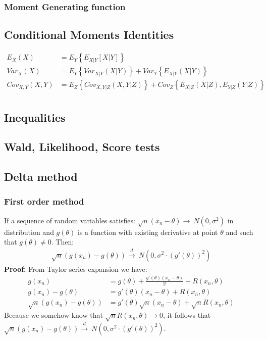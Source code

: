 \documentclass[]{article}
\begin{document}
\subsubsection{Moment Generating function}
\subsection{Conditional Moments Identities}
$$
\begin{aligned}
	E_X(X) &= E_Y\left\{E_{X|Y}[X|Y]\right\}\\
	Var_X(X)&= E_Y\left\{Var_{X|Y}(X|Y)\right\}  +   Var_Y\left\{E_{X|Y}(X|Y)\right\}\\
	Cov_{X,Y}(X,Y)&= E_Z\left\{Cov_{X,Y|Z}(X,Y|Z)\right\}  +   Cov_Z\left\{E_{X|Z}(X|Z), E_{Y|Z}(Y|Z)\right\}\\
\end{aligned}
$$


\subsection{Inequalities}
\subsection{Wald, Likelihood, Score tests}
\subsection{Delta method}
\subsubsection{First order method}
If a sequence of random variables satisfies: $\sqrt{n}(x_n - \theta) \rightarrow~N(0, \sigma^2)$ in distribution and $g(\theta)$ is a function with existing derivative at point $\theta$ and such that $g(\theta) \neq 0$. Then:
$$
\begin{aligned}
	\sqrt{n}(g(x_n) - g(\theta)) \overset{d}{\rightarrow}~N(0, \sigma^2\cdot (g'(\theta))^2)
\end{aligned}
$$
\textbf{Proof:} From Taylor series expansion we have:
$$
\begin{aligned}
	g(x_n) &= g(\theta) + \frac{g'(\theta)(x_n - \theta)}{1!} + R(x_n, \theta)\\
	g(x_n) - g(\theta) &= g'(\theta)(x_n - \theta) + R(x_n, \theta)\\
	\sqrt{n}(g(x_n) - g(\theta)) &= g'(\theta)\sqrt{n}(x_n - \theta) + \sqrt{n}R(x_n, \theta)
\end{aligned}
$$
Because we somehow know that $\sqrt{n}R(x_n, \theta) \rightarrow 0$, it follows that $	\sqrt{n}(g(x_n) - g(\theta)) \overset{d}{\rightarrow}~N(0, \sigma^2\cdot (g'(\theta))^2)$.
\end{document}
